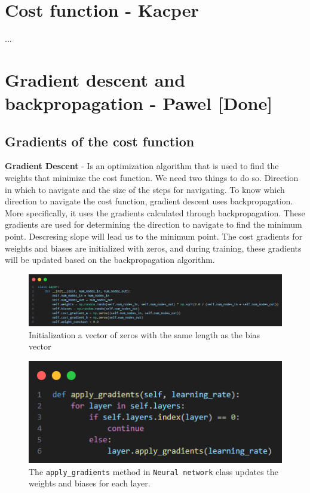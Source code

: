 \documentclass{article}
\begin{document}
\newpage
\section{Cost function - Kacper}
...

\newpage
\section{Gradient descent and backpropagation - Pawel [Done]}
\subsection{Gradients of the cost function}
\textbf{Gradient Descent} - Is an optimization algorithm that is used to find the weights that minimize the cost function. 
We need two things to do so. Direction in which to navigate and the size of the steps for navigating.
To know which direction to navigate the cost function, gradient descent uses backpropagation. More specifically, it uses the gradients calculated through backpropagation. These gradients are used for determining the direction to navigate to find the minimum point. Descresing slope will lead us to the minimum point.
The cost gradients for weights and biases are initialized with zeros, and during training, these gradients will be updated based on the backpropagation algorithm.

\begin{figure}[ht]
    \centering 
    \includegraphics[width=1\textwidth]{images/Xavier-Glorot-initialization-for-weights.png}
    \caption{Initialization a vector of zeros with the same length as the bias vector}
    \label{fig:initialized_cost_gradient}
\end{figure}

\begin{figure}[ht]
    \centering 
    \includegraphics[width=1\textwidth]{images/apply-gradients.png}
    \caption{The \texttt{apply\_gradients} method in \texttt{Neural network} class  updates the weights and biases for each layer.}
    \label{fig:apply_gradients}
\end{figure}
\end{document}
